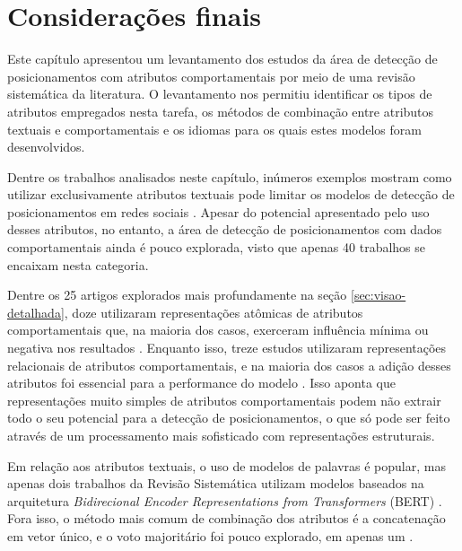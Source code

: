 \documentclass[
	12pt, oneside, a4paper, english, brazil
]{abntex2ppgsi}
\begin{document}
\section{Considerações finais}

Este capítulo apresentou um levantamento dos estudos da área de detecção de posicionamentos com atributos comportamentais por meio de uma revisão sistemática da literatura. O levantamento nos permitiu identificar os tipos de atributos empregados nesta tarefa, os métodos de combinação entre atributos textuais e comportamentais e os idiomas para os quais estes modelos foram desenvolvidos. 

Dentre os trabalhos analisados neste capítulo, inúmeros exemplos mostram como utilizar exclusivamente atributos textuais pode limitar os modelos de detecção de posicionamentos em redes sociais \cite{hu2021, li2021, espinosa2020deepreading, yuan2017, tanmoy2022, tahar2017, lucie2022, andrew2019, walid2019, ku2018, paolo2019}. Apesar do potencial apresentado pelo uso desses atributos, no entanto, a área de detecção de posicionamentos com dados comportamentais ainda é pouco explorada, visto que apenas 40 trabalhos se encaixam nesta categoria.

Dentre os 25 artigos explorados mais profundamente na seção \ref{sec:visao-detalhada}, doze utilizaram representações atômicas de atributos comportamentais que, na maioria dos casos, exerceram influência mínima ou negativa nos resultados \cite{kentaro2016, daniel2017, paolo2017, olga2017, ayaz2021, xia2019, singh2018, li2021}. Enquanto isso, treze estudos utilizaram representações relacionais de atributos comportamentais, e na maioria dos casos a adição desses atributos foi essencial para a performance do modelo \cite{espinosa2020deepreading, yuan2017, tanmoy2022, tahar2017, mohand2018, andrew2019, walid2019, ku2018, paolo2019, paolo_brexit2020}. Isso aponta que representações muito simples de atributos comportamentais podem não extrair todo o seu potencial para a detecção de posicionamentos, o que só pode ser feito através de um processamento mais sofisticado com representações estruturais. 

Em relação aos atributos textuais, o uso de modelos de palavras é popular, mas apenas dois trabalhos da Revisão Sistemática utilizam modelos baseados na arquitetura {\em Bidirecional Encoder Representations from Transformers} (BERT) \cite{carolina2020, stefan2022}. Fora isso, o método mais comum de combinação dos atributos é a concatenação em vetor único, e o voto majoritário foi pouco explorado, em apenas um \cite{tanmoy2022}.
\end{document}
